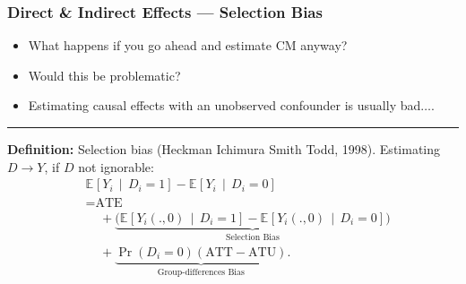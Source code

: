 \documentclass[dvipsnames]{beamer} %
\newcommand{\Prob}[1]{\Pr\left( #1 \right)}                         %
\newcommand{\Egiven}[3][]{\mathbb{E}_{#1} \left[ #2 \, \middle\vert \, #3 \right]} %
\begin{document}
\begin{frame}[noframenumbering]
    \frametitle{Direct \& Indirect Effects --- Selection Bias}
    \begin{itemize}
        \item What happens if you go ahead and estimate CM anyway?
        \item Would this be problematic?
        \item Estimating causal effects with an unobserved confounder is usually bad$\hdots$.
    \end{itemize}
    \par\noindent\rule{\textwidth}{0.4pt}
    \vskip0.25cm
    \textbf{Definition:} Selection bias (Heckman Ichimura Smith Todd, 1998).
    \vskip0.25cm
    Estimating $D \to Y$, if $D$ not ignorable:
    \begin{align*}
        &\Egiven{ Y_i}{D_i =1} - \Egiven{ Y_i}{D_i =0} \\
        &= \text{ATE} \\
        &\;\;\;\; + \underbrace{\Big(
            \Egiven{ Y_i(., 0)}{D_i =1} - \Egiven{ Y_i(.,0)}{D_i =0} \Big)}_{
                \text{Selection Bias}} \\
        &\;\;\;\;+ \underbrace{ \Prob{D_i=0} (\text{ATT}- \text{ATU}) }_{
            \text{Group-differences Bias}}.
    \end{align*}
\end{frame}
\end{document}
